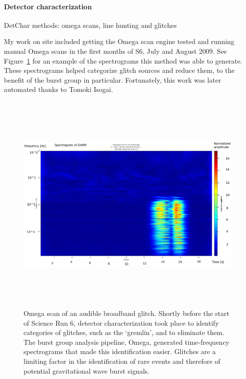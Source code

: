                 \paragraph{Detector characterization}
                \label{detchar}
            
                    DetChar methods: omega scans, line hunting and glitches

My work on site included getting the Omega scan engine tested and running manual Omega scans in the first months of S6, July and August 2009. 
See Figure~\ref{omega_scan_audible_glitch} for an example of the spectrograms this method was able to generate. These spectrograms helped categorize glitch sources and reduce them, to the benefit of the burst group in particular.
Fortunately, this work was later automated thanks to Tomoki Isogai. 


\begin{figure}
\begin{center}
\includegraphics[height=111mm, width=148mm]{aglitch928228390_new.eps} 
\caption{Omega scan of an audible broadband glitch. Shortly before the start of Science Run 6, detector characterization took place to identify categories of glitches, such as the `gremlin', and to eliminate them. The burst group analysis pipeline, Omega, generated time-frequency spectrograms that made this identification easier. Glitches are a limiting factor in the identification of rare events and therefore of potential gravitational wave burst signals.}
\label{omega_scan_audible_glitch}
\end{center}
\end{figure}

